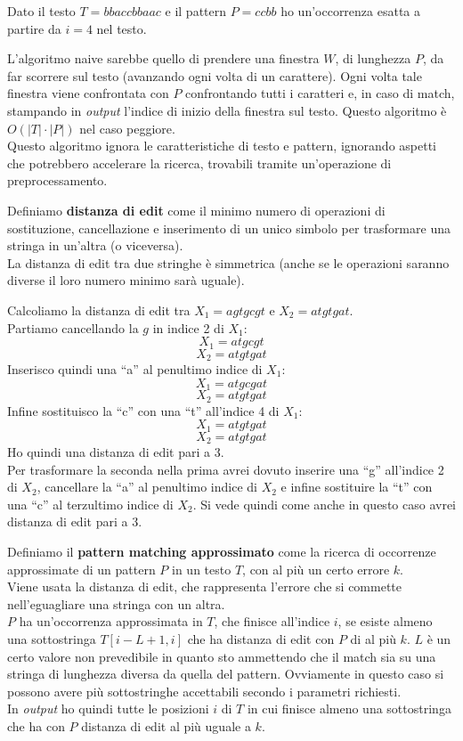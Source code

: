 \begin{esempio}
  Dato il testo $T=bbaccbbaac$ e il pattern $P=ccbb$ ho un'occorrenza esatta a
  partire da $i=4$ nel testo.
\end{esempio}
L'algoritmo naive sarebbe quello di prendere una finestra $W$, di lunghezza $P$,
da far scorrere sul testo (avanzando ogni volta di un carattere). Ogni volta
tale finestra viene confrontata con $P$ confrontando tutti i caratteri e, in
caso di match, stampando in \textit{output} l'indice di inizio della finestra sul
testo. Questo algoritmo è $O(|T|\cdot |P|)$ nel caso peggiore.\\ 
Questo algoritmo ignora le caratteristiche di testo e pattern, ignorando aspetti
che potrebbero accelerare la ricerca, trovabili tramite un'operazione di
preprocessamento.
\begin{definizione}
  Definiamo \textbf{distanza di edit} come il minimo numero di operazioni di
  sostituzione, cancellazione e inserimento di un unico simbolo per trasformare
  una stringa in un'altra (o viceversa). \\
  La distanza di edit tra due stringhe è simmetrica (anche se le operazioni
  saranno diverse il loro numero minimo sarà uguale).
\end{definizione}
\begin{esempio}
  Calcoliamo la distanza di edit tra $X_1=agtgcgt$ e $X_2=atgtgat$.\\
  Partiamo cancellando la $g$ in indice 2 di $X_1$:
  \[X_1=atgcgt\]
  \[X_2=atgtgat\]
  Inserisco quindi una ``a'' al penultimo indice di $X_1$:
  \[X_1=atgcgat\]
  \[X_2=atgtgat\]
  Infine sostituisco la ``c'' con una ``t'' all'indice 4 di $X_1$:
  \[X_1=atgtgat\]
  \[X_2=atgtgat\]
  Ho quindi una distanza di edit pari a 3.\\
  Per trasformare la seconda nella prima avrei dovuto inserire una ``g''
  all'indice 2 di $X_2$, cancellare la ``a'' al penultimo indice di $X_2$ e
  infine sostituire la ``t'' con una ``c'' al terzultimo indice di $X_2$. Si
  vede quindi come anche in questo caso avrei distanza di edit pari a 3.
\end{esempio}
\begin{definizione}
  Definiamo il \textbf{pattern matching approssimato} come la ricerca di
  occorrenze approssimate di un pattern $P$ in un testo $T$, con al più un certo
  errore $k$.\\
  Viene usata la \textnormal{distanza di edit}, che rappresenta l'errore che si
  commette nell'eguagliare una stringa con un altra.\\
  $P$ ha un'occorrenza approssimata in $T$, che finisce all'indice $i$, se
  esiste almeno una sottostringa $T[i-L+1,i]$ che ha distanza di edit con $P$ di
  al più $k$. $L$ è un certo valore non prevedibile in quanto sto ammettendo che
  il match sia su una stringa di lunghezza diversa da quella del
  pattern. Ovviamente in questo caso si possono avere più sottostringhe
  accettabili secondo i parametri richiesti.\\
  In \textit{output} ho quindi tutte le posizioni $i$ di $T$ in cui finisce almeno una
  sottostringa che ha con $P$ distanza di edit al più uguale a $k$.
\end{definizione}
